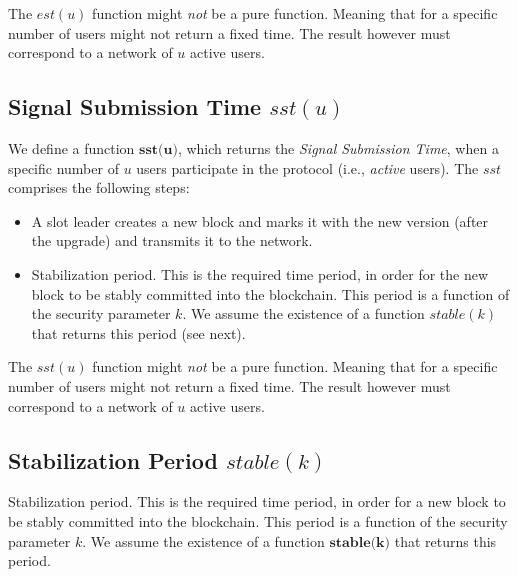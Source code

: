 The $est(u)$ function might \emph{not} be a pure function. Meaning that for a specific number of users might not return a fixed time. The result however must correspond to a network of $u$ active users.

\subsection{Signal Submission Time $sst(u)$}
We define a function $\textbf{sst(u)}$, which returns the \emph{Signal Submission Time}, when a specific number of $u$ users participate in the protocol (i.e., \emph{active} users). The $sst$ comprises the following steps:
\begin{itemize}
\item A slot leader creates a new block and marks it with the new version (after the upgrade) and transmits it to the network.
\item Stabilization period. This is the required time period, in order for the new block to be stably committed into the blockchain. This period is a function of the security parameter $k$. We assume the existence of a function $stable(k)$ that returns this period (see next). 
\end{itemize}

The $sst(u)$ function might \emph{not} be a pure function. Meaning that for a specific number of users might not return a fixed time. The result however must correspond to a network of $u$ active users.


\subsection{Stabilization Period $stable(k)$}
Stabilization period. This is the required time period, in order for a new block to be stably committed into the blockchain. This period is a function of the security parameter $k$. We assume the existence of a function $\textbf{stable(k)}$ that returns this period.
